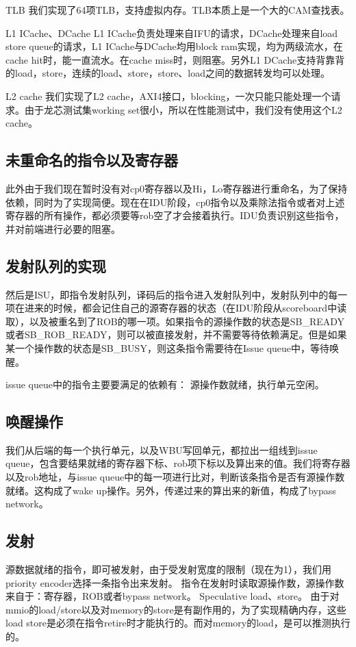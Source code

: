 \documentclass[lang=cn,11pt,a4paper]{elegantpaper}
\begin{document}
TLB
我们实现了64项TLB，支持虚拟内存。TLB本质上是一个大的CAM查找表。

L1 ICache、DCache
L1 ICache负责处理来自IFU的请求，DCache处理来自load store queue的请求，L1 ICache与DCache均用block ram实现，均为两级流水，在cache hit时，能一直流水。在cache miss时，则阻塞。另外L1 DCache支持背靠背的load，store，连续的load、store，store、load之间的数据转发均可以处理。

L2 cache
我们实现了L2 cache，AXI4接口，blocking，一次只能只能处理一个请求。由于龙芯测试集working set很小，所以在性能测试中，我们没有使用这个L2 cache。

\subsection{未重命名的指令以及寄存器}

此外由于我们现在暂时没有对cp0寄存器以及Hi，Lo寄存器进行重命名，为了保持依赖，同时为了实现简便。现在在IDU阶段，cp0指令以及乘除法指令或者对上述寄存器的所有操作，都必须要等rob空了才会接着执行。IDU负责识别这些指令，并对前端进行必要的阻塞。

\subsection{发射队列的实现}

然后是ISU，即指令发射队列，译码后的指令进入发射队列中，发射队列中的每一项在进来的时候，都会记住自己的源寄存器的状态（在IDU阶段从scoreboard中读取），以及被重名到了ROB的哪一项。如果指令的源操作数的状态是SB\_READY或者SB\_ROB\_READY，则可以被直接发射，并不需要等待依赖满足。但是如果某一个操作数的状态是SB\_BUSY，则这条指令需要待在Issue queue中，等待唤醒。

issue queue中的指令主要要满足的依赖有：
源操作数就绪，执行单元空闲。

\subsection{唤醒操作}
我们从后端的每一个执行单元，以及WBU写回单元，都拉出一组线到issue queue，包含要结果就绪的寄存器下标、rob项下标以及算出来的值。我们将寄存器以及rob地址，与issue queue中的每一项进行比对，判断该条指令是否有源操作数就绪。这构成了wake up操作。另外，传递过来的算出来的新值，构成了bypass network。

\subsection{发射}
源数据就绪的指令，即可被发射，由于受发射宽度的限制（现在为1），我们用priority encoder选择一条指令出来发射。
指令在发射时读取源操作数，源操作数来自于：寄存器，ROB或者bypass network。
Speculative load、store。
由于对mmio的load/store以及对memory的store是有副作用的，为了实现精确内存，这些load store是必须在指令retire时才能执行的。而对memory的load，是可以推测执行的。
\end{document}
